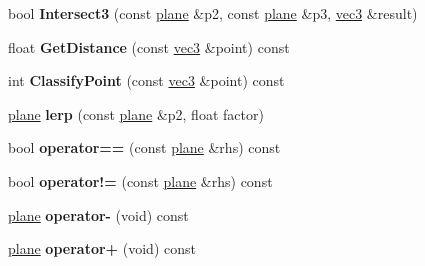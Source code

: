 \begin{DoxyCompactItemize}
\item 
\hypertarget{classmath_1_1plane_af6f50a2db368dced1ae9572422d6d7e2}{
bool {\bfseries Intersect3} (const \hyperlink{classmath_1_1plane}{plane} \&p2, const \hyperlink{classmath_1_1plane}{plane} \&p3, \hyperlink{classmath_1_1vec3}{vec3} \&result)}
\label{classmath_1_1plane_af6f50a2db368dced1ae9572422d6d7e2}

\item 
\hypertarget{classmath_1_1plane_ab27db4ca27caec4dd84311483ba65c23}{
float {\bfseries GetDistance} (const \hyperlink{classmath_1_1vec3}{vec3} \&point) const }
\label{classmath_1_1plane_ab27db4ca27caec4dd84311483ba65c23}

\item 
\hypertarget{classmath_1_1plane_af3871a442fb338ab1524f96d9956b68f}{
int {\bfseries ClassifyPoint} (const \hyperlink{classmath_1_1vec3}{vec3} \&point) const }
\label{classmath_1_1plane_af3871a442fb338ab1524f96d9956b68f}

\item 
\hypertarget{classmath_1_1plane_affa8cd87ad8b3da63511d526fd81a1a6}{
\hyperlink{classmath_1_1plane}{plane} {\bfseries lerp} (const \hyperlink{classmath_1_1plane}{plane} \&p2, float factor)}
\label{classmath_1_1plane_affa8cd87ad8b3da63511d526fd81a1a6}

\item 
\hypertarget{classmath_1_1plane_ac5c24435016da495c52e9a7ca9cc1f08}{
bool {\bfseries operator==} (const \hyperlink{classmath_1_1plane}{plane} \&rhs) const }
\label{classmath_1_1plane_ac5c24435016da495c52e9a7ca9cc1f08}

\item 
\hypertarget{classmath_1_1plane_a45108625f3dc606b7df31386cce2f1c2}{
bool {\bfseries operator!=} (const \hyperlink{classmath_1_1plane}{plane} \&rhs) const }
\label{classmath_1_1plane_a45108625f3dc606b7df31386cce2f1c2}

\item 
\hypertarget{classmath_1_1plane_a4c9f64519742f6d7d0370a62101733c4}{
\hyperlink{classmath_1_1plane}{plane} {\bfseries operator-\/} (void) const }
\label{classmath_1_1plane_a4c9f64519742f6d7d0370a62101733c4}

\item 
\hypertarget{classmath_1_1plane_a57123617c9e3bfaed24cc655205b17ed}{
\hyperlink{classmath_1_1plane}{plane} {\bfseries operator+} (void) const }
\label{classmath_1_1plane_a57123617c9e3bfaed24cc655205b17ed}

\end{DoxyCompactItemize}
